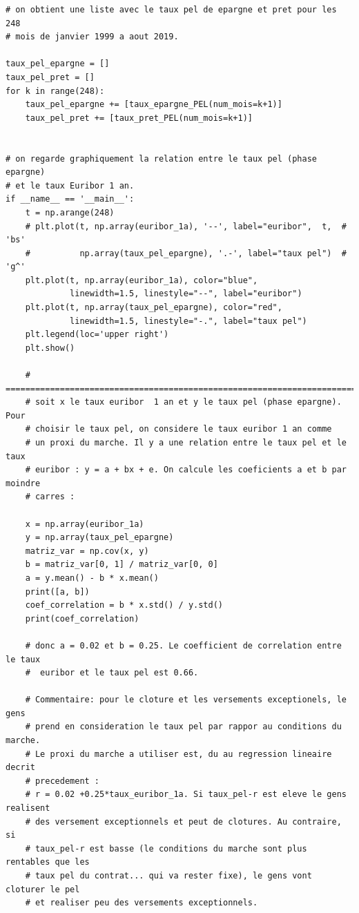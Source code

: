 \documentclass[12pt, a4paper]{book}
\begin{document}
{\begin{small}
\begin{verbatim}
# on obtient une liste avec le taux pel de epargne et pret pour les 248
# mois de janvier 1999 a aout 2019.

taux_pel_epargne = []
taux_pel_pret = []
for k in range(248):
    taux_pel_epargne += [taux_epargne_PEL(num_mois=k+1)]
    taux_pel_pret += [taux_pret_PEL(num_mois=k+1)]


# on regarde graphiquement la relation entre le taux pel (phase epargne)
# et le taux Euribor 1 an.
if __name__ == '__main__':
    t = np.arange(248)
    # plt.plot(t, np.array(euribor_1a), '--', label="euribor",  t,  # 'bs'
    #          np.array(taux_pel_epargne), '.-', label="taux pel")  # 'g^'
    plt.plot(t, np.array(euribor_1a), color="blue",
             linewidth=1.5, linestyle="--", label="euribor")
    plt.plot(t, np.array(taux_pel_epargne), color="red",
             linewidth=1.5, linestyle="-.", label="taux pel")
    plt.legend(loc='upper right')
    plt.show()

    # =========================================================================
    # soit x le taux euribor  1 an et y le taux pel (phase epargne). Pour
    # choisir le taux pel, on considere le taux euribor 1 an comme
    # un proxi du marche. Il y a une relation entre le taux pel et le taux
    # euribor : y = a + bx + e. On calcule les coeficients a et b par moindre
    # carres :

    x = np.array(euribor_1a)
    y = np.array(taux_pel_epargne)
    matriz_var = np.cov(x, y)
    b = matriz_var[0, 1] / matriz_var[0, 0]
    a = y.mean() - b * x.mean()
    print([a, b])
    coef_correlation = b * x.std() / y.std()
    print(coef_correlation)

    # donc a = 0.02 et b = 0.25. Le coefficient de correlation entre le taux
    #  euribor et le taux pel est 0.66.

    # Commentaire: pour le cloture et les versements exceptionels, le gens
    # prend en consideration le taux pel par rappor au conditions du marche.
    # Le proxi du marche a utiliser est, du au regression lineaire decrit
    # precedement :
    # r = 0.02 +0.25*taux_euribor_1a. Si taux_pel-r est eleve le gens realisent
    # des versement exceptionnels et peut de clotures. Au contraire, si
    # taux_pel-r est basse (le conditions du marche sont plus rentables que les
    # taux pel du contrat... qui va rester fixe), le gens vont cloturer le pel
    # et realiser peu des versements exceptionnels.

\end{verbatim}
\end{small}

}
\end{document}
